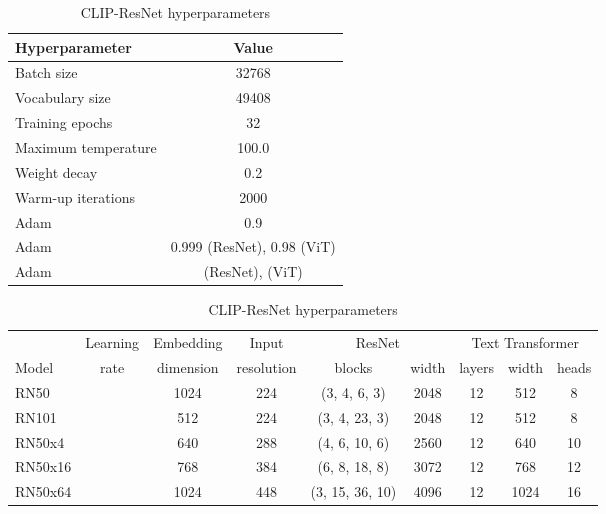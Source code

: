 \documentclass{article}
\begin{document}
\begin{table}[h!]
\begin{minipage}{\textwidth}
\centering

\begin{tabular}{l|c} \toprule
    Hyperparameter  & Value \\ \midrule
    Batch size & 32768 \\
    Vocabulary size & 49408 \\
    Training epochs & 32 \\
    Maximum temperature & 100.0 \\
    Weight decay & 0.2 \\
    Warm-up iterations & 2000 \\
    Adam  & 0.9 \\
    Adam  & 0.999 (ResNet), 0.98 (ViT)\\
    Adam  &  (ResNet),  (ViT)\\
    \bottomrule
\end{tabular}
\caption{Common CLIP hyperparameters}



\vspace{2em}

\small
\begin{tabular}{l|cccccccc} \toprule
          & Learning & Embedding & Input      & \multicolumn{2}{c}{ResNet}  & \multicolumn{3}{c}{Text Transformer} \\
    Model & rate & dimension & resolution & blocks & width  & layers & width & heads  \\ \midrule
    RN50  &  & 1024 & 224 & (3, 4, 6, 3) & 2048 & 12 & 512 & 8 \\
    RN101 &  & 512 & 224 & (3, 4, 23, 3) & 2048 & 12 & 512 & 8 \\
    RN50x4 &  & 640 & 288 & (4, 6, 10, 6) & 2560 & 12 & 640 & 10 \\
    RN50x16 &  & 768 & 384 & (6, 8, 18, 8) & 3072 & 12 & 768 & 12 \\
    RN50x64 &  & 1024 & 448 & (3, 15, 36, 10) & 4096 & 12 & 1024 & 16 \\ 
    \bottomrule
\end{tabular}
\caption{CLIP-ResNet hyperparameters}


\vspace{2em}



\end{minipage}
\end{table}
\end{document}
